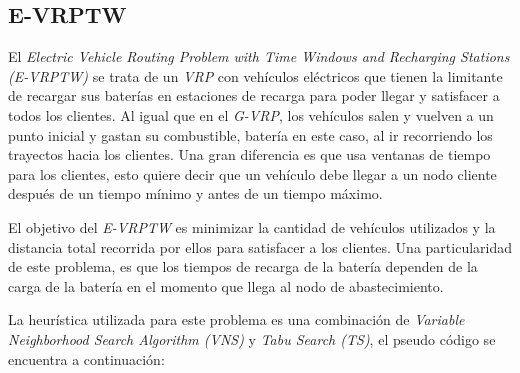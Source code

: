 \documentclass[letter, 10pt]{article}
\begin{document}
\subsection{E-VRPTW}

El \textit{Electric Vehicle Routing Problem with Time Windows and Recharging Stations (E-VRPTW)}
\cite{E-VRPTW} se trata de
un \textit{VRP} con vehículos eléctricos que tienen la limitante de recargar sus baterías en estaciones
 de recarga para poder llegar y satisfacer
a todos los clientes. Al igual que en el \textit{G-VRP}, los vehículos salen y vuelven a un punto inicial y gastan su combustible,
batería en este caso, al ir recorriendo los trayectos hacia los clientes. Una gran diferencia es que usa
ventanas de tiempo para los clientes, esto quiere decir que un vehículo debe llegar a un nodo cliente
después de un tiempo mínimo y antes de un tiempo máximo.

El objetivo del \textit{E-VRPTW} es minimizar la cantidad de vehículos utilizados y la distancia total
recorrida por ellos para satisfacer a los clientes. Una particularidad de este problema,
es que los tiempos de recarga de la batería dependen de la carga
de la batería en el momento que llega al nodo de abastecimiento.

\newpage
La heurística utilizada para este problema es una combinación de \textit{Variable Neighborhood Search Algorithm (VNS)} y 
\textit{Tabu Search (TS)}, el pseudo código se encuentra a continuación:
\end{document}
